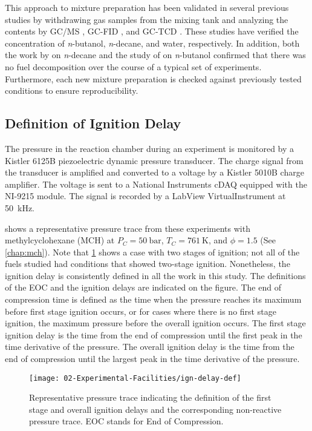 \documentclass[../main.tex]{subfiles}
\begin{document}
This approach to mixture preparation has been validated in several previous
studies by withdrawing gas samples from the mixing tank and analyzing the
contents by GC/MS \cite{Weber2011}, GC-FID \cite{Kumar2009}, and GC-TCD
\cite{Das2012}. These studies have verified the concentration of
\textit{n}-butanol, \textit{n}-decane, and water, respectively. In addition,
both the work by \textcite{Kumar2009} on \textit{n}-decane and the study of
\textcite{Weber2011} on \textit{n}-butanol confirmed that there was no fuel
decomposition over the course of a typical set of experiments. Furthermore,
each new mixture preparation is checked against previously tested
conditions to ensure reproducibility.

\subsection{Definition of Ignition Delay}
\label{sec:ig-delay-def}

The pressure in the reaction chamber during an experiment is monitored by a
Kistler 6125B piezoelectric dynamic pressure transducer. The charge signal from the
transducer is amplified and converted to a voltage by a Kistler 5010B charge amplifier.
The voltage is sent to a National Instruments cDAQ equipped with the NI-9215 module.
The signal is recorded by a LabView VirtualInstrument at \SI{50}{\kilo\hertz}.

 shows a representative pressure trace from
these experiments with methylcyclohexane (MCH) at $P_C= \SI{50}{\bar}$, $T_C=\SI{761}{\kelvin}$,
and $\phi=\num{1.5}$ (See \cref{chap:mch}). Note that \cref{fig:ig-delay-def}
shows a case with two stages of ignition; not all of the fuels studied
had conditions that showed two-stage ignition. Nonetheless, the ignition
delay is consistently defined in all the work in this study. The
definitions of the EOC and the ignition delays are indicated on the figure.
The end of compression time is defined as the time when the pressure
reaches its maximum before first stage ignition occurs, or for cases
where there is no first stage ignition, the maximum pressure before
the overall ignition occurs. The first stage ignition delay is the time
from the end of compression until the first peak in the time derivative
of the pressure. The overall ignition delay is the time from the end of
compression until the largest peak in the time derivative of the pressure.

\begin{figure}
    \texttt{[image: 02-Experimental-Facilities/ign-delay-def]}
    \caption{Representative pressure trace indicating the definition of
    the first stage and overall ignition delays and the corresponding
    non-reactive pressure trace. EOC stands for End of Compression.}
    \label{fig:ig-delay-def}
\end{figure}
\end{document}

